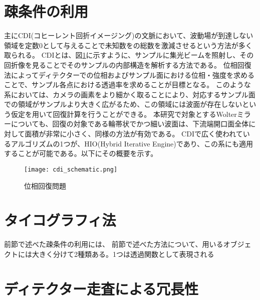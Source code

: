 \clearpage
\newpage

\section{疎条件の利用}
主にCDI(コヒーレント回折イメージング)の文脈において、波動場が到達しない領域を定数0として与えることで未知数をの総数を激減させるという方法が多く取られる。
CDIとは、図\ref{fig:cdi_schematic}に示すように、サンプルに集光ビームを照射し、その回折像を見ることでそのサンプルの内部構造を解析する方法である。
位相回復法によってディテクターでの位相およびサンプル面における位相・強度を求めることで、サンプル各点における透過率を求めることが目標となる。
このような系においては、カメラの画素をより細かく取ることにより、対応するサンプル面での領域がサンプルより大きく広がるため、この領域には波面が存在しないという仮定を用いて回復計算を行うことができる。
本研究で対象とするWolterミラーについても、回復の対象である輪帯状でかつ細い波面は、下流端開口面全体に対して面積が非常に小さく、同様の方法が有効である。
CDIで広く使われているアルゴリズムの1つが、HIO(Hybrid Iterative Engine)であり、この系にも適用することが可能である。以下にその概要を示す。

\begin{figure}[!ht]
\centering
\texttt{[image: cdi\_schematic.png]}
\caption{位相回復問題}
\label{fig:cdi_schematic}
\end{figure}


\clearpage
\newpage

\section{タイコグラフィ法}
前節で述べた疎条件の利用には、
前節で述べた方法について、用いるオブジェクトには大きく分けて2種類ある。1つは透過関数として表現される

\clearpage
\newpage


\section{ディテクター走査による冗長性}


\clearpage
\newpage

